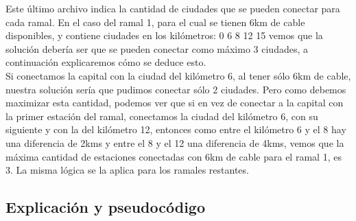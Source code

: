 Este último archivo indica la cantidad de ciudades que se pueden conectar para cada ramal. En el caso del ramal 1, para el cual se tienen 6km de cable disponibles, y contiene ciudades en los kilómetros: 0 6 8 12 15 vemos que la solución debería ser que se pueden conectar como máximo 3 ciudades, a continuación explicaremos cómo se deduce esto.\\

Si conectamos la capital con la ciudad del kilómetro 6, al tener sólo 6km de cable, nuestra solución sería que pudimos conectar sólo 2 ciudades. Pero como debemos maximizar esta cantidad, podemos ver que si en vez de conectar a la capital con la primer estación del ramal, conectamos la ciudad del kilómetro 6, con su siguiente y con la del kilómetro 12, entonces como entre el kilómetro 6 y el 8 hay una diferencia de 2kms y entre el 8 y el 12 una diferencia de 4kms, vemos que la máxima cantidad de estaciones conectadas con 6km de cable para el ramal 1, es 3. La misma lógica se la aplica para los ramales restantes.\\


\subsection{Explicación y pseudocódigo}

